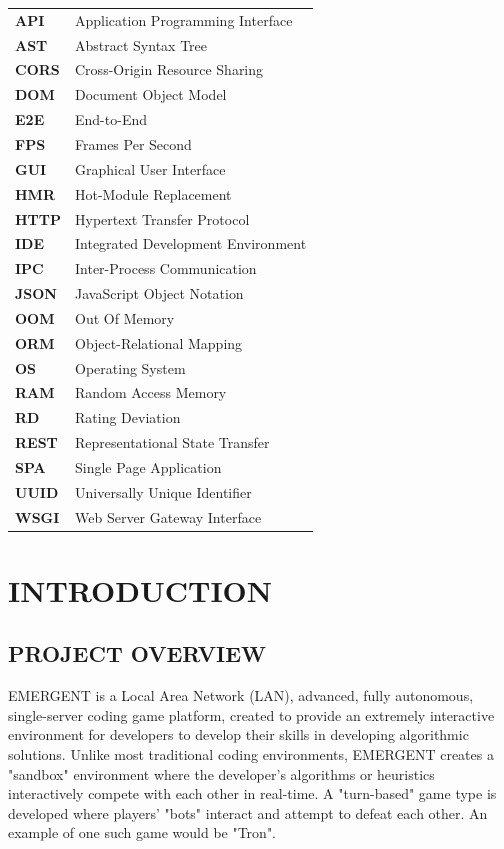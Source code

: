 \documentclass[12pt,a4paper]{report}
\begin{document}
\vspace{0.1cm}
\noindent
\renewcommand{\arraystretch}{1.5}
\begin{tabular}{@{}ll}
\textbf{API} & Application Programming Interface \\
\textbf{AST} & Abstract Syntax Tree \\
\textbf{CORS} & Cross-Origin Resource Sharing \\
\textbf{DOM} & Document Object Model \\
\textbf{E2E} & End-to-End \\
\textbf{FPS} & Frames Per Second \\
\textbf{GUI} & Graphical User Interface \\
\textbf{HMR} & Hot-Module Replacement \\
\textbf{HTTP} & Hypertext Transfer Protocol \\
\textbf{IDE} & Integrated Development Environment \\
\textbf{IPC} & Inter-Process Communication \\
\textbf{JSON} & JavaScript Object Notation \\
\textbf{OOM} & Out Of Memory \\
\textbf{ORM} & Object-Relational Mapping \\
\textbf{OS} & Operating System \\
\textbf{RAM} & Random Access Memory \\
\textbf{RD} & Rating Deviation \\
\textbf{REST} & Representational State Transfer \\
\textbf{SPA} & Single Page Application \\
\textbf{UUID} & Universally Unique Identifier \\
\textbf{WSGI} & Web Server Gateway Interface \\
\end{tabular}
\newpage


\chapter{INTRODUCTION}

\section{PROJECT OVERVIEW}
EMERGENT is a Local Area Network (LAN), advanced, fully autonomous, single-server coding game platform, created to provide an extremely interactive environment for developers to develop their skills in developing algorithmic solutions. Unlike most traditional coding environments, EMERGENT creates a "sandbox" environment where the developer's algorithms or heuristics interactively compete with each other in real-time. A "turn-based" game type is developed where players' "bots" interact and attempt to defeat each other. An example of one such game would be "Tron". 
\end{document}
